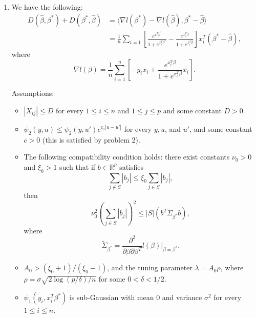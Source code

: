\documentclass[12pt]{article}
\begin{document}
\begin{enumerate}
\item
We have the following:
\begin{align*}
D(\hat{\beta}, \beta^*) + D(\beta^*, \hat{\beta}) &= \langle \nabla l(\beta^*) - \nabla l(\hat{\beta}), \beta^* - \hat{\beta} \rangle \\
&= \frac{1}{n} \sum_{i=1} \left[\frac{e^{x_i^T\beta^*}}{1 + e^{x_i^T\beta^*}} - \frac{e^{x_i^T\hat{\beta}}}{1 + e^{x_i^T\hat{\beta}}}\right]x_i^T(\beta^* - \hat{\beta}),
\end{align*}
where
\begin{equation*}
\nabla l(\beta) = \frac{1}{n} \sum_{i=1}^n \left[-y_ix_i + \frac{e^{x_i^T\beta}}{1 + e^{x_i^T\beta}}x_i\right].
\end{equation*}

Assumptions:
\begin{itemize}
\item
$|X_{ij}| \leq D$ for every $1 \leq i \leq n$ and $1 \leq j \leq p$ and some constant $D > 0$.
\item
$\psi_2(y, u) \leq \psi_2(y, u') e^{c_1|u - u'|}$ for every $y, u$, and $u'$, and some constant $c > 0$ (this is satisfied by problem 2).
\item
The following compatibility condition holds: there exist constants $\nu_0 > 0$ and $\xi_0 > 1$ such that if $b \in \mathbb{R}^p$ satisfies
\begin{equation*}
\sum_{j \not \in S} |b_j| \leq \xi_0 \sum_{j \in S} |b_j|,
\end{equation*}
then
\begin{equation*}
\nu_0^2\left(\sum_{j \in S} |b_j| \right)^2 \leq |S| (b^T \widetilde{\Sigma}_{\beta^*} b),
\end{equation*}
where
\begin{equation*}
\widetilde{\Sigma}_{\beta^*} = \frac{\partial^2}{\partial \beta \partial \beta^T} l(\beta) \Big|_{\beta = \beta^*}.
\end{equation*}
\item
$A_0 > (\xi_0 + 1) / (\xi_0 - 1)$, and the tuning parameter $\lambda = A_0 \rho$, where $\rho = \sigma \sqrt{2\log(p / \delta) / n}$ for some $0 < \delta < 1/2$.
\item
$\psi_1(y_i, x_i^T\beta^*)$ is sub-Gaussian with mean $0$ and variance $\sigma^2$ for every $1 \leq i \leq n$.
\end{itemize}


\end{enumerate}
\end{document}
